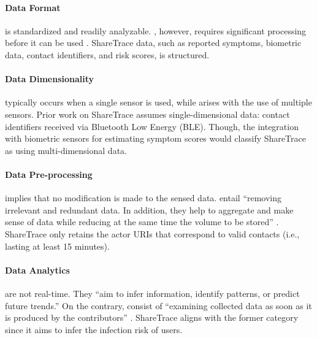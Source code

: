 \paragraph{Data Format}

 is standardized and readily analyzable. , however, requires significant processing before it can be used \citep{Capponi2019}. ShareTrace data, such as reported symptoms, biometric data, contact identifiers, and risk scores, is structured.

\paragraph{Data Dimensionality}

 typically occurs when a single sensor is used, while  arises with the use of multiple sensors. Prior work on ShareTrace assumes single-dimensional data: contact identifiers received via Bluetooth Low Energy (BLE). Though, the integration with biometric sensors for estimating symptom scores would classify ShareTrace as using multi-dimensional data.

\paragraph{Data Pre-processing}

 implies that no modification is made to the sensed data.  entail ``removing irrelevant and redundant data. In addition, they help to aggregate and make sense of data while reducing at the same time the volume to be stored'' \citep{Capponi2019}. ShareTrace only retains the actor URIs that correspond to valid contacts (i.e., lasting at least 15 minutes).

\paragraph{Data Analytics}

 are not real-time. They ``aim to infer information, identify patterns, or predict future trends.'' On the contrary,  consist of ``examining collected data as soon as it is produced by the contributors'' \citep{Capponi2019}. ShareTrace aligns with the former category since it aims to infer the infection risk of users.

